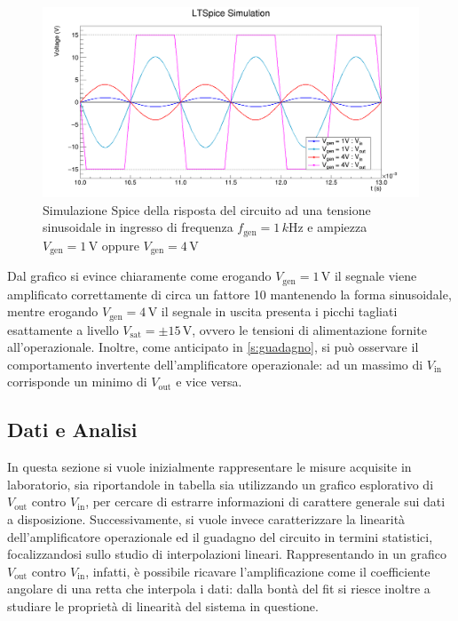 \documentclass[a4paper,11pt]{article} %
\begin{document}
\begin{figure}[H]
	\centering
	\includegraphics[width=\linewidth]{../Plots/Report_Plots/opamp_spice_1V_4V.png}
	\caption{Simulazione Spice della risposta del circuito ad una tensione sinusoidale in ingresso di frequenza
	$f_{\text{gen}}=1\,\si{k\hertz}$ e ampiezza $V_{\text{gen}}=1\,\si{\volt}$ oppure $V_{\text{gen}}=4\,\si{\volt}$}
	\label{i:opamp_simulation}
\end{figure}

\noindent Dal grafico si evince chiaramente come erogando $V_{\text{gen}}=1\,\si{\volt}$ il segnale viene amplificato
correttamente di circa un fattore 10 mantenendo la forma sinusoidale, mentre erogando $V_{\text{gen}}=4\,\si{\volt}$ il
segnale in uscita presenta i picchi tagliati esattamente a livello $V_{\text{sat}}=\pm 15\,\si{\volt}$, ovvero le
tensioni di alimentazione fornite all'operazionale. Inoltre, come anticipato in \autoref{s:guadagno}, si può osservare il comportamento invertente
dell'amplificatore operazionale: ad un massimo di $V_{\text{in}}$ corrisponde un minimo di $V_{\text{out}}$ e vice
versa.\\



\subsection{Dati e Analisi}
In questa sezione si vuole inizialmente rappresentare le misure acquisite in laboratorio, sia riportandole in tabella
sia utilizzando un grafico esplorativo di $V_{\text{out}}$ contro $V_{\text{in}}$, per cercare di estrarre informazioni
di carattere generale sui dati a disposizione. Successivamente, si vuole invece caratterizzare la linearità
dell'amplificatore operazionale ed il guadagno del circuito in termini statistici, focalizzandosi sullo studio di interpolazioni
lineari. Rappresentando in un grafico $V_{\text{out}}$ contro $V_{\text{in}}$, infatti, è possibile ricavare
l'amplificazione come il coefficiente angolare di una retta che interpola i dati: dalla bontà del fit si riesce inoltre a
studiare le proprietà di linearità del sistema in questione.
\end{document}
